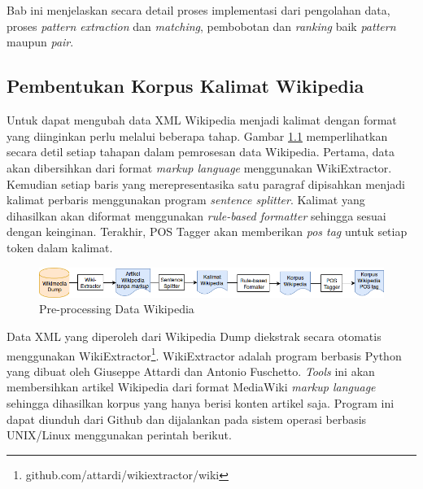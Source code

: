 \chapter{\babEmpat}
Bab ini menjelaskan secara detail proses implementasi dari pengolahan data, proses \textit{pattern extraction} dan \textit{matching}, pembobotan dan \textit{ranking} baik \textit{pattern} maupun \textit{pair}.

%
\section{Pembentukan Korpus Kalimat Wikipedia}
Untuk dapat mengubah data XML Wikipedia menjadi kalimat dengan format yang diinginkan perlu melalui beberapa tahap. Gambar \ref{fig:preproses-wiki} memperlihatkan secara detil setiap tahapan dalam pemrosesan data Wikipedia. Pertama, data akan dibersihkan dari format \textit{markup language} menggunakan WikiExtractor. Kemudian setiap baris yang merepresentasika satu paragraf dipisahkan menjadi kalimat perbaris menggunakan program \textit{sentence splitter}. Kalimat yang dihasilkan akan diformat menggunakan \textit{rule-based formatter} sehingga sesuai dengan keinginan. Terakhir, POS Tagger akan memberikan \textit{pos tag} untuk setiap token dalam kalimat.

\begin{figure}
    \centering
    \includegraphics[width=\linewidth]{pics/Pic02-PreProcessingWikipedia}
    \caption{Pre-processing Data Wikipedia}
    \label{fig:preproses-wiki}
\end{figure}

Data XML yang diperoleh dari Wikipedia Dump diekstrak secara otomatis menggunakan WikiExtractor\footnote{github.com/attardi/wikiextractor/wiki}. WikiExtractor adalah program berbasis Python yang dibuat oleh Giuseppe Attardi dan Antonio Fuschetto. \textit{Tools} ini akan membersihkan artikel Wikipedia dari format MediaWiki \textit{markup language} sehingga dihasilkan korpus yang hanya berisi konten artikel saja. Program ini dapat diunduh dari Github dan dijalankan pada sistem operasi berbasis UNIX/Linux menggunakan perintah berikut. 

